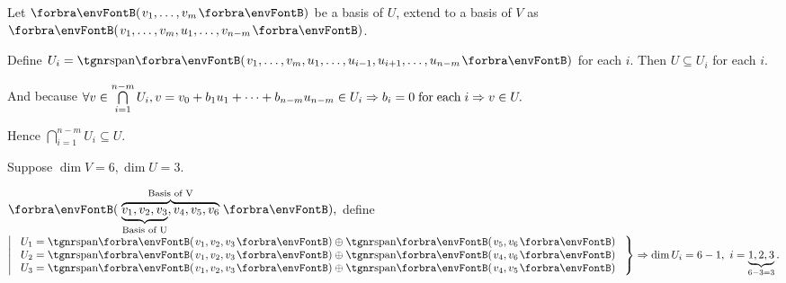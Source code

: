 \documentclass[a4paper, 11pt, UTF8]{article}
\begin{document}
\begin{large}
\par\quad
Let $\Par{v_1,\dots,v_m}$ be a basis of $U$, extend to a basis of $V$ as $\Par{v_1,\dots,v_m,u_1,\dots,v_{n-m}}$.\par\quad
Define $U_i=\Span{v_1,\dots,v_m,u_1,\dots,u_{i-1},u_{i+1},\dots,u_{n-m}}$ for each $i$. Then $U\subseteq U_i$ for each $i.$\vspace{4pt}\par\quad
\vspace{2pt}And because $\forall v\in \bigcap\limits_{i=1}^{n-m}U_i,v=v_0+b_1 u_1+\dots+b_{n-m} u_{n-m}\in U_i\Rightarrow b_i=0 \text{\;for\;each\;} i\Rightarrow v\in U.$\par\quad
\vspace{8pt}Hence $\bigcap\limits_{i=1}^{n-m}U_i\subseteq U.$\PfEnd
\Example\,\,\, {Suppose $\dim V=6,\dim U=3$.\par\quad
$\Par{\overbrace{\underbrace{v_1,v_2,v_3}_\text{Basis of U},v_4,v_5,v_6}^\text{Basis of V}},$ define $\hMath[0pt]{l}{\left|}{\right\}}{$
$U_1=\Span{v_1,v_2,v_3}\oplus\Span{v_5,v_6}\\ $
$U_2=\Span{v_1,v_2,v_3}\oplus\Span{v_4,v_6}\\ $
$U_3=\Span{v_1,v_2,v_3}\oplus\Span{v_4,v_5}$
$}\Rightarrow\dim U_i=6-1,\,\,i=\underbrace{1,2,3}_{6-3=3}.$}
\PfEnd\vspace{10pt}
\SepLine


\end{large}
\end{document}

